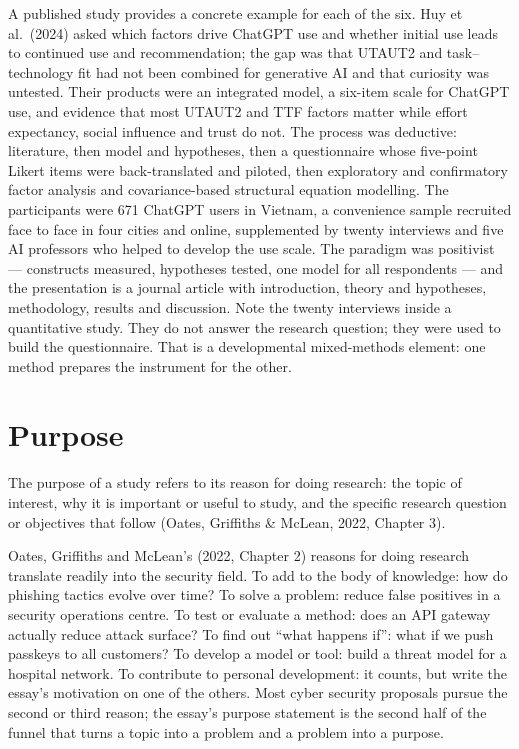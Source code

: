 \documentclass[11pt,a4paper,british,twoside=false,headings=small,chapterprefix=false,numbers=noenddot]{scrbook}
\newenvironment{block}[1]{\begin{tcolorbox}[scriptbox, title={#1}]}{\end{tcolorbox}}
\begin{document}
A published study provides a concrete example for each of the six. Huy et al.\ (2024) asked which factors drive ChatGPT use and whether initial use leads to continued use and recommendation; the gap was that UTAUT2 and task--technology fit had not been combined for generative AI and that curiosity was untested. Their products were an integrated model, a six-item scale for ChatGPT use, and evidence that most UTAUT2 and TTF factors matter while effort expectancy, social influence and trust do not. The process was deductive: literature, then model and hypotheses, then a questionnaire whose five-point Likert items were back-translated and piloted, then exploratory and confirmatory factor analysis and covariance-based structural equation modelling. The participants were 671 ChatGPT users in Vietnam, a convenience sample recruited face to face in four cities and online, supplemented by twenty interviews and five AI professors who helped to develop the use scale. The paradigm was positivist --- constructs measured, hypotheses tested, one model for all respondents --- and the presentation is a journal article with introduction, theory and hypotheses, methodology, results and discussion. Note the twenty interviews inside a quantitative study. They do not answer the research question; they were used to build the questionnaire. That is a developmental mixed-methods element: one method prepares the instrument for the other.

\section{Purpose}

\begin{block}{Purpose}
The purpose of a study refers to its reason for doing research: the topic of interest, why it is important or useful to study, and the specific research question or objectives that follow (Oates, Griffiths \& McLean, 2022, Chapter 3).
\end{block}

Oates, Griffiths and McLean's (2022, Chapter 2) reasons for doing research translate readily into the security field. To add to the body of knowledge: how do phishing tactics evolve over time? To solve a problem: reduce false positives in a security operations centre. To test or evaluate a method: does an API gateway actually reduce attack surface? To find out ``what happens if'': what if we push passkeys to all customers? To develop a model or tool: build a threat model for a hospital network. To contribute to personal development: it counts, but write the essay's motivation on one of the others. Most cyber security proposals pursue the second or third reason; the essay's purpose statement is the second half of the funnel that turns a topic into a problem and a problem into a purpose.
\end{document}
